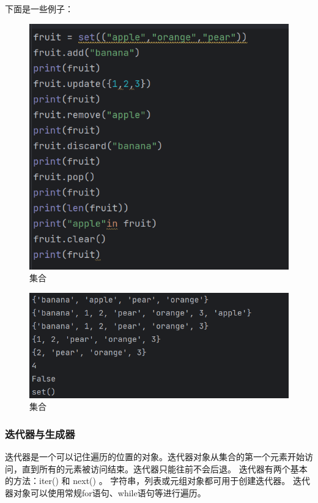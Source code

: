 \documentclass{ctexart}
\begin{document}
	下面是一些例子：
	
	\begin{figure}[H]
		\centering
		\includegraphics[scale=0.5]{3.53}
		\caption{集合}
	\end{figure}
	
	\begin{figure}[H]
		\centering
		\includegraphics[scale=0.5]{3.54}
		\caption{集合}
	\end{figure}
	
	\subsubsection{迭代器与生成器}
	
	迭代器是一个可以记住遍历的位置的对象。迭代器对象从集合的第一个元素开始访问，直到所有的元素被访问结束。迭代器只能往前不会后退。
	迭代器有两个基本的方法：iter() 和 next() 。
	字符串，列表或元组对象都可用于创建迭代器。
	迭代器对象可以使用常规for语句、while语句等进行遍历。
	
\end{document}
